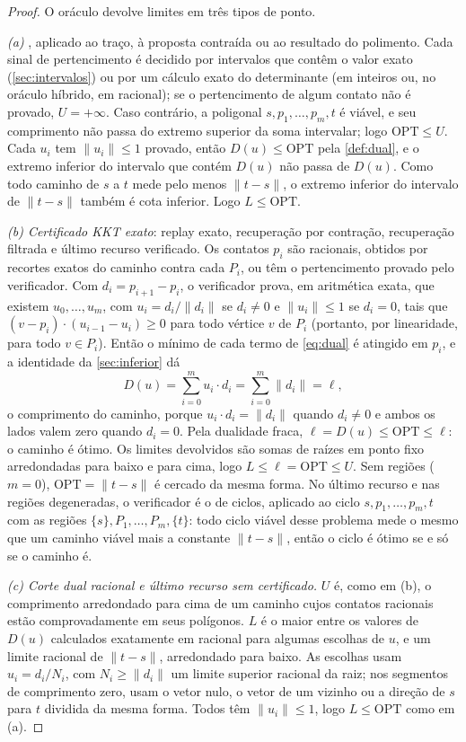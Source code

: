 \documentclass[11pt,a4paper]{article}
\theoremstyle{plain}\newtheorem{proposicao}{Proposição}
\theoremstyle{definition}\newtheorem{definicao}{Definição}
\theoremstyle{plain}\newtheorem{teorema}{Teorema}
\newcommand{\norm}[1]{\lVert#1\rVert}
\newcommand{\OPT}{\mathrm{OPT}}
\begin{document}
\begin{proof}
O oráculo devolve limites em três tipos de ponto.

\emph{(a) }, aplicado ao traço, à proposta contraída ou ao resultado do polimento. Cada sinal de pertencimento é decidido por intervalos que contêm o valor exato (\cref{sec:intervalos}) ou por um cálculo exato do determinante (em inteiros ou, no oráculo híbrido, em racional); se o pertencimento de algum contato não é provado, \(U=+\infty\). Caso contrário, a poligonal \(s,p_1,\dots,p_m,t\) é viável, e seu comprimento não passa do extremo superior da soma intervalar; logo \(\OPT\le U\). Cada \(u_i\) tem \(\norm{u_i}\le1\) provado, então \(D(u)\le\OPT\) pela \cref{def:dual}, e o extremo inferior do intervalo que contém \(D(u)\) não passa de \(D(u)\). Como todo caminho de \(s\) a \(t\) mede pelo menos \(\norm{t-s}\), o extremo inferior do intervalo de \(\norm{t-s}\) também é cota inferior. Logo \(L\le\OPT\).

\emph{(b) Certificado KKT exato}: replay exato, recuperação por contração, recuperação filtrada e último recurso verificado. Os contatos \(p_i\) são racionais, obtidos por recortes exatos do caminho contra cada \(P_i\), ou têm o pertencimento provado pelo verificador. Com \(d_i=p_{i+1}-p_i\), o verificador prova, em aritmética exata, que existem \(u_0,\dots,u_m\), com \(u_i=d_i/\norm{d_i}\) se \(d_i\ne0\) e \(\norm{u_i}\le1\) se \(d_i=0\), tais que \((v-p_i)\cdot(u_{i-1}-u_i)\ge0\) para todo vértice \(v\) de \(P_i\) (portanto, por linearidade, para todo \(v\in P_i\)). Então o mínimo de cada termo de \eqref{eq:dual} é atingido em \(p_i\), e a identidade da \cref{sec:inferior} dá
\[
D(u)=\sum_{i=0}^m u_i\cdot d_i=\sum_{i=0}^m\norm{d_i}=\ell,
\]
o comprimento do caminho, porque \(u_i\cdot d_i=\norm{d_i}\) quando \(d_i\ne0\) e ambos os lados valem zero quando \(d_i=0\). Pela dualidade fraca, \(\ell=D(u)\le\OPT\le\ell\): o caminho é ótimo. Os limites devolvidos são somas de raízes em ponto fixo arredondadas para baixo e para cima, logo \(L\le\ell=\OPT\le U\). Sem regiões (\(m=0\)), \(\OPT=\norm{t-s}\) é cercado da mesma forma. No último recurso e nas regiões degeneradas, o verificador é o de ciclos, aplicado ao ciclo \(s,p_1,\dots,p_m,t\) com as regiões \(\{s\},P_1,\dots,P_m,\{t\}\): todo ciclo viável desse problema mede o mesmo que um caminho viável mais a constante \(\norm{t-s}\), então o ciclo é ótimo se e só se o caminho é.

\emph{(c) Corte dual racional e último recurso sem certificado.} \(U\) é, como em (b), o comprimento arredondado para cima de um caminho cujos contatos racionais estão comprovadamente em seus polígonos. \(L\) é o maior entre os valores de \(D(u)\) calculados exatamente em racional para algumas escolhas de \(u\), e um limite racional de \(\norm{t-s}\), arredondado para baixo. As escolhas usam \(u_i=d_i/N_i\), com \(N_i\ge\norm{d_i}\) um limite superior racional da raiz; nos segmentos de comprimento zero, usam o vetor nulo, o vetor de um vizinho ou a direção de \(s\) para \(t\) dividida da mesma forma. Todos têm \(\norm{u_i}\le1\), logo \(L\le\OPT\) como em (a).


\end{proof}
\end{document}

